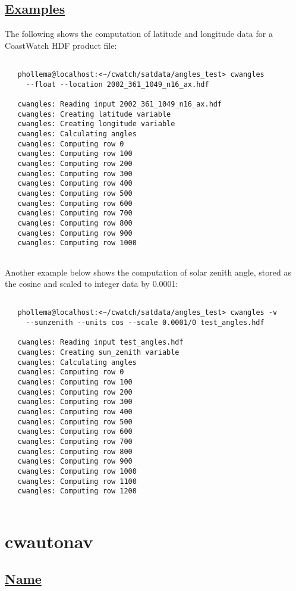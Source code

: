 \subsection*{\underline{Examples}}


  The following shows the computation of latitude and longitude data for a CoastWatch HDF product file: \begin{verbatim}
 
   phollema@localhost:<~/cwatch/satdata/angles_test> cwangles 
     --float --location 2002_361_1049_n16_ax.hdf

   cwangles: Reading input 2002_361_1049_n16_ax.hdf
   cwangles: Creating latitude variable
   cwangles: Creating longitude variable
   cwangles: Calculating angles
   cwangles: Computing row 0
   cwangles: Computing row 100
   cwangles: Computing row 200
   cwangles: Computing row 300
   cwangles: Computing row 400
   cwangles: Computing row 500
   cwangles: Computing row 600
   cwangles: Computing row 700
   cwangles: Computing row 800
   cwangles: Computing row 900
   cwangles: Computing row 1000
 
\end{verbatim}
 Another example below shows the computation of solar zenith angle, stored as the cosine and scaled to integer data by 0.0001: \begin{verbatim}
 
   phollema@localhost:<~/cwatch/satdata/angles_test> cwangles -v 
     --sunzenith --units cos --scale 0.0001/0 test_angles.hdf 

   cwangles: Reading input test_angles.hdf
   cwangles: Creating sun_zenith variable
   cwangles: Calculating angles
   cwangles: Computing row 0
   cwangles: Computing row 100
   cwangles: Computing row 200
   cwangles: Computing row 300
   cwangles: Computing row 400
   cwangles: Computing row 500
   cwangles: Computing row 600
   cwangles: Computing row 700
   cwangles: Computing row 800
   cwangles: Computing row 900
   cwangles: Computing row 1000
   cwangles: Computing row 1100
   cwangles: Computing row 1200
 
\end{verbatim}


\newpage
\section{cwautonav} \hypertarget{cwautonav}{}
\subsection*{\underline{Name}}


